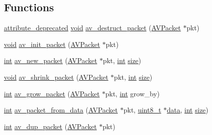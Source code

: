 \subsection*{Functions}
\begin{DoxyCompactItemize}
\item 
\hyperlink{attributes_8h_aa6d076561d3a9eea4729ee632652de02}{attribute\+\_\+deprecated} \hyperlink{sound_8c_ae35f5844602719cf66324f4de2a658b3}{void} \hyperlink{group__lavc__packet_ga7582daad8c59bb6e5df39db6f9881d97}{av\+\_\+destruct\+\_\+packet} (\hyperlink{struct_a_v_packet}{A\+V\+Packet} $\ast$pkt)
\item 
\hyperlink{sound_8c_ae35f5844602719cf66324f4de2a658b3}{void} \hyperlink{group__lavc__packet_gac9cb9756175b96e7441575803757fb73}{av\+\_\+init\+\_\+packet} (\hyperlink{struct_a_v_packet}{A\+V\+Packet} $\ast$pkt)
\item 
\hyperlink{xmltok_8h_a5a0d4a5641ce434f1d23533f2b2e6653}{int} \hyperlink{group__lavc__packet_gadfa708660b85a56749c753124de2da7d}{av\+\_\+new\+\_\+packet} (\hyperlink{struct_a_v_packet}{A\+V\+Packet} $\ast$pkt, \hyperlink{xmltok_8h_a5a0d4a5641ce434f1d23533f2b2e6653}{int} \hyperlink{group__lavu__mem_ga854352f53b148adc24983a58a1866d66}{size})
\item 
\hyperlink{sound_8c_ae35f5844602719cf66324f4de2a658b3}{void} \hyperlink{group__lavc__packet_gaceba1c21e5718f87abdf61cf21500485}{av\+\_\+shrink\+\_\+packet} (\hyperlink{struct_a_v_packet}{A\+V\+Packet} $\ast$pkt, \hyperlink{xmltok_8h_a5a0d4a5641ce434f1d23533f2b2e6653}{int} \hyperlink{group__lavu__mem_ga854352f53b148adc24983a58a1866d66}{size})
\item 
\hyperlink{xmltok_8h_a5a0d4a5641ce434f1d23533f2b2e6653}{int} \hyperlink{group__lavc__packet_ga74f66e072998b8ce81ef3aba8d617a58}{av\+\_\+grow\+\_\+packet} (\hyperlink{struct_a_v_packet}{A\+V\+Packet} $\ast$pkt, \hyperlink{xmltok_8h_a5a0d4a5641ce434f1d23533f2b2e6653}{int} grow\+\_\+by)
\item 
\hyperlink{xmltok_8h_a5a0d4a5641ce434f1d23533f2b2e6653}{int} \hyperlink{group__lavc__packet_ga7ca877e1f0ded89a27199b65e9a077dc}{av\+\_\+packet\+\_\+from\+\_\+data} (\hyperlink{struct_a_v_packet}{A\+V\+Packet} $\ast$pkt, \hyperlink{lib-src_2ffmpeg_2win32_2stdint_8h_a9a941819355e6f658991890ff66b4b0e}{uint8\+\_\+t} $\ast$\hyperlink{lib_2expat_8h_ac39e72a1de1cb50dbdc54b08d0432a24}{data}, \hyperlink{xmltok_8h_a5a0d4a5641ce434f1d23533f2b2e6653}{int} \hyperlink{group__lavu__mem_ga854352f53b148adc24983a58a1866d66}{size})
\item 
\hyperlink{xmltok_8h_a5a0d4a5641ce434f1d23533f2b2e6653}{int} \hyperlink{group__lavc__packet_ga04c83bc8a685960564a169f3a050b915}{av\+\_\+dup\+\_\+packet} (\hyperlink{struct_a_v_packet}{A\+V\+Packet} $\ast$pkt)

\end{DoxyCompactItemize}
